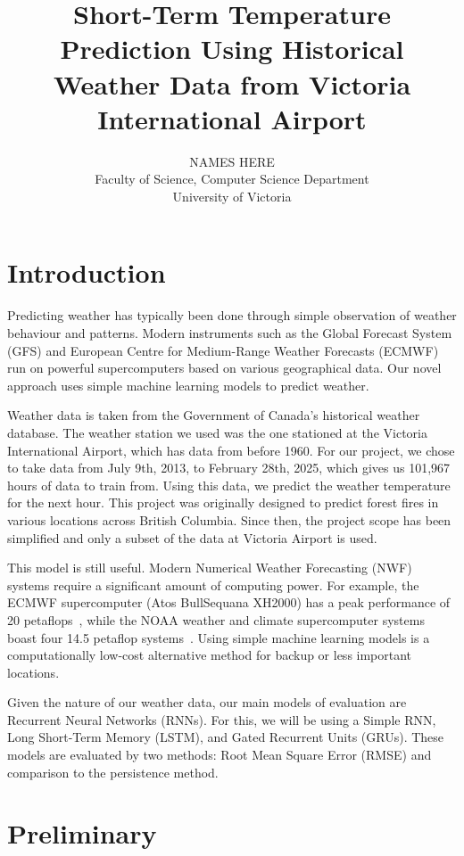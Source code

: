 \documentclass[11pt]{article}
\title{\textbf{Short-Term Temperature Prediction Using Historical Weather Data from Victoria International Airport}}
\author{NAMES HERE \\
Faculty of Science, Computer Science Department \\
University of Victoria}
\date{}
\begin{document}
\maketitle

\section*{Introduction}

Predicting weather has typically been done through simple observation of weather behaviour and patterns. Modern instruments such as the Global Forecast System (GFS) and European Centre for Medium-Range Weather Forecasts (ECMWF)~\cite{surfertoday} run on powerful supercomputers based on various geographical data. Our novel approach uses simple machine learning models to predict weather. 

Weather data is taken from the Government of Canada's historical weather database. The weather station we used was the one stationed at the Victoria International Airport, which has data from before 1960. For our project, we chose to take data from July 9th, 2013, to February 28th, 2025, which gives us 101,967 hours of data to train from. Using this data, we predict the weather temperature for the next hour. This project was originally designed to predict forest fires in various locations across British Columbia. Since then, the project scope has been simplified and only a subset of the data at Victoria Airport is used. 

This model is still useful. Modern Numerical Weather Forecasting (NWF) systems require a significant amount of computing power. For example, the ECMWF supercomputer (Atos BullSequana XH2000) has a peak performance of 20 petaflops~\cite{ecmwf}, while the NOAA weather and climate supercomputer systems boast four 14.5 petaflop systems~\cite{noaa}. Using simple machine learning models is a computationally low-cost alternative method for backup or less important locations. 

Given the nature of our weather data, our main models of evaluation are Recurrent Neural Networks (RNNs). For this, we will be using a Simple RNN, Long Short-Term Memory (LSTM), and Gated Recurrent Units (GRUs). These models are evaluated by two methods: Root Mean Square Error (RMSE) and comparison to the persistence method. 

\section*{Preliminary}
\end{document}
